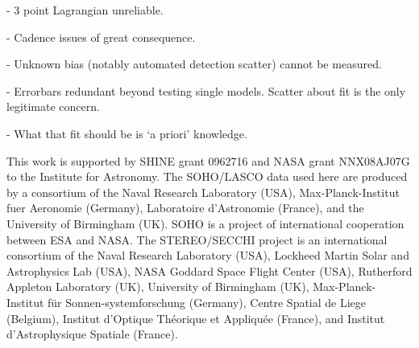 \documentclass[structabstract]{aa}
\begin{document}
- 3 point Lagrangian unreliable.

- Cadence issues of great consequence.

- Unknown bias (notably automated detection scatter) cannot be measured.

- Errorbars redundant beyond testing single models. Scatter about fit is the only legitimate concern.

- What that fit should be is `a priori' knowledge.


\begin{acknowledgements}
This work is supported by SHINE grant 0962716 and NASA grant NNX08AJ07G to the Institute for Astronomy. The SOHO/LASCO data used here are produced by a consortium of the Naval Research Laboratory (USA), Max-Planck-Institut fuer Aeronomie (Germany), Laboratoire d'Astronomie (France), and the University of Birmingham (UK). SOHO is a project of international cooperation between ESA and NASA. The STEREO/SECCHI project is an international consortium of the Naval Research Laboratory (USA), Lockheed Martin Solar and Astrophysics Lab (USA), NASA Goddard Space Flight Center (USA), Rutherford Appleton Laboratory (UK), University of Birmingham (UK), Max-Planck-Institut f\"{u}r Sonnen-systemforschung (Germany), Centre Spatial de Liege (Belgium), Institut d'Optique Th\'{e}orique et Appliqu\'{e}e (France), and Institut d'Astrophysique Spatiale (France). 
\end{acknowledgements}




  
\end{document}
